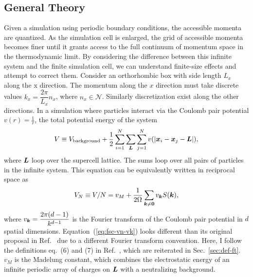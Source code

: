 \subsection{General Theory}
Given a simulation using periodic boundary conditions, the accessible momenta are quantized. As the simulation cell is enlarged, the grid of accessible momenta becomes finer until it grants access to the full continuum of momentum space in the thermodynamic limit. By considering the difference between this infinite system and the finite simulation cell, we can understand finite-size effects and attempt to correct them.
Consider an orthorhombic box with side length $L_x$ along the x direction. The momentum along the $x$ direction must take discrete values $k_x=\dfrac{2\pi}{L_x}n_x$, where $n_x\in\mathcal{N}$. Similarly discretization exist along the other directions.
In a simulation where particles interact via the Coulomb pair potential $v(r)=\frac{1}{r}$, the total potential energy of the system %
\begin{align}
V \equiv V_{\text{background}} +
\frac{1}{2}\sum\limits_{i=1}^N
\sum\limits_{\boldsymbol{L}}\sum\limits_{j=1}^N
v(\vert\boldsymbol{x}_i-\boldsymbol{x}_j-\boldsymbol{L}\vert),
\end{align}
where $\boldsymbol{L}$ loop over the supercell lattice.
The sums loop over all pairs of particles in the infinite system.
This equation can be equivalently written in reciprocal space as
\begin{align} \label{eq:fsc-vn-vk}
V_N \equiv V/N = v_M + \frac{1}{2\Omega} \sum\limits_{\boldsymbol{k}\neq\boldsymbol{0}} v_{\boldsymbol{k}} S(\boldsymbol{k}),
\end{align}
where $v_{\boldsymbol{k}}=\dfrac{2\pi (d-1)}{k^{d-1}}$ is the Fourier transform of the Coulomb pair potential in $d$ spatial dimensions. Equation~(\ref{eq:fsc-vn-vk}) looks different than its original proposal in Ref.~\cite{Chiesa2006} due to a different Fourier transform convention. Here, I follow the definitions eq.~(6) and (7) in Ref.~\cite{Holzmann2016}, which are reiterated in Sec.~\ref{sec:def-ft}.
$v_M$ is the Madelung constant, which combines the electrostatic energy of an infinite periodic array of charges on $\boldsymbol{L}$ with a neutralizing background.

